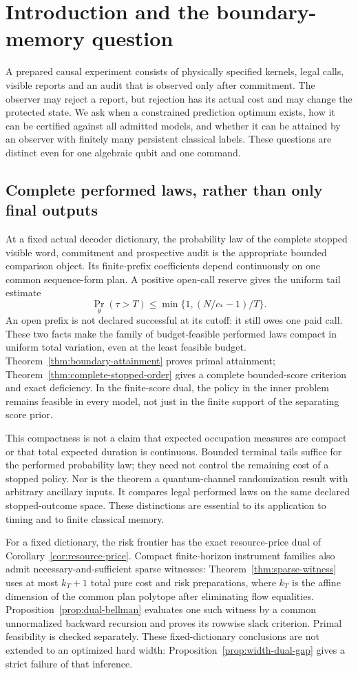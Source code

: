 \section{Introduction and the boundary-memory question}\label{sec:introduction}
A prepared causal experiment consists of physically specified kernels, legal calls, visible reports and an audit that is observed only after commitment. The observer may reject a report, but rejection has its actual cost and may change the protected state. We ask when a constrained prediction optimum exists, how it can be certified against all admitted models, and whether it can be attained by an observer with finitely many persistent classical labels. These questions are distinct even for one algebraic qubit and one command.

\subsection{Complete performed laws, rather than only final outputs}
At a fixed actual decoder dictionary, the probability law of the complete stopped visible word, commitment and prospective audit is the appropriate bounded comparison object. Its finite-prefix coefficients depend continuously on one common sequence-form plan. A positive open-call reserve gives the uniform tail estimate
\[
 \Pr_\theta(\tau>T)\le\min\{1,(N/c_*-1)/T\}.
\]
An open prefix is not declared successful at its cutoff: it still owes one paid call. These two facts make the family of budget-feasible performed laws compact in uniform total variation, even at the least feasible budget. Theorem~\ref{thm:boundary-attainment} proves primal attainment; Theorem~\ref{thm:complete-stopped-order} gives a complete bounded-score criterion and exact deficiency. In the finite-score dual, the policy in the inner problem remains feasible in every model, not just in the finite support of the separating score prior.

This compactness is not a claim that expected occupation measures are compact or that total expected duration is continuous. Bounded terminal tails suffice for the performed probability law; they need not control the remaining cost of a stopped policy. Nor is the theorem a quantum-channel randomization result with arbitrary ancillary inputs. It compares legal performed laws on the same declared stopped-outcome space. These distinctions are essential to its application to timing and to finite classical memory.

For a fixed dictionary, the risk frontier has the exact resource-price dual of Corollary~\ref{cor:resource-price}. Compact finite-horizon instrument families also admit necessary-and-sufficient sparse witnesses: Theorem~\ref{thm:sparse-witness} uses at most $k_T+1$ total pure cost and risk preparations, where $k_T$ is the affine dimension of the common plan polytope after eliminating flow equalities. Proposition~\ref{prop:dual-bellman} evaluates one such witness by a common unnormalized backward recursion and proves its rowwise slack criterion. Primal feasibility is checked separately. These fixed-dictionary conclusions are not extended to an optimized hard width: Proposition~\ref{prop:width-dual-gap} gives a strict failure of that inference.


